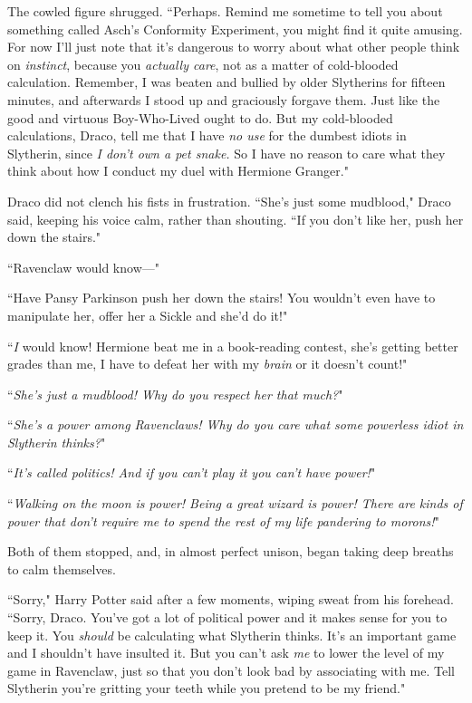 The cowled figure shrugged. ``Perhaps. Remind me sometime to tell you about something called Asch's Conformity Experiment, you might find it quite amusing. For now I'll just note that it's dangerous to worry about what other people think on \emph{instinct}, because you \emph{actually care}, not as a matter of cold-blooded calculation. Remember, I was beaten and bullied by older Slytherins for fifteen minutes, and afterwards I stood up and graciously forgave them. Just like the good and virtuous Boy-Who-Lived ought to do. But my cold-blooded calculations, Draco, tell me that I have \emph{no use} for the dumbest idiots in Slytherin, since \emph{I don't own a pet snake.} So I have no reason to care what they think about how I conduct my duel with Hermione Granger."

Draco did not clench his fists in frustration. ``She's just some mudblood," Draco said, keeping his voice calm, rather than shouting. ``If you don't like her, push her down the stairs."

``Ravenclaw would know—"

``Have Pansy Parkinson push her down the stairs! You wouldn't even have to manipulate her, offer her a Sickle and she'd do it!"

``\emph{I} would know! Hermione beat me in a book-reading contest, she's getting better grades than me, I have to defeat her with my \emph{brain} or it doesn't count!"

``\emph{She's just a mudblood! Why do you respect her that much?}"

``\emph{She's a power among Ravenclaws! Why do you care what some powerless idiot in Slytherin thinks?}"

``\emph{It's called politics! And if you can't play it you can't have power!}"

``\emph{Walking on the moon is power! Being a great wizard is power! There are kinds of power that don't require me to spend the rest of my life pandering to morons!}"

Both of them stopped, and, in almost perfect unison, began taking deep breaths to calm themselves.

``Sorry," Harry Potter said after a few moments, wiping sweat from his forehead. ``Sorry, Draco. You've got a lot of political power and it makes sense for you to keep it. You \emph{should} be calculating what Slytherin thinks. It's an important game and I shouldn't have insulted it. But you can't ask \emph{me} to lower the level of my game in Ravenclaw, just so that you don't look bad by associating with me. Tell Slytherin you're gritting your teeth while you pretend to be my friend."

